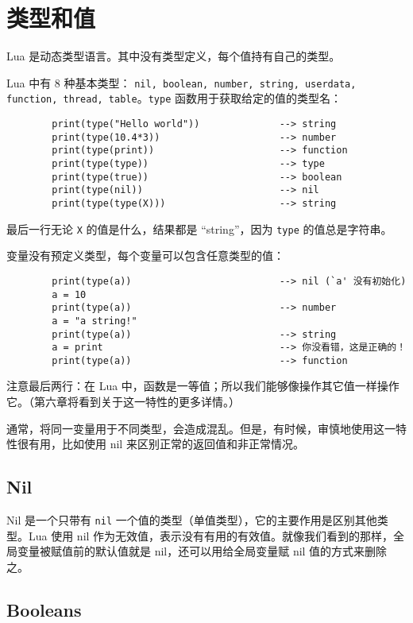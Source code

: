 \chapter{类型和值}

Lua 是动态类型语言。其中没有类型定义，每个值持有自己的类型。

Lua 中有 8 种基本类型： \verb|nil, boolean, number, string, userdata, function, thread, table|。\verb|type| 函数用于获取给定的值的类型名：
\begin{verbatim}
        print(type("Hello world"))              --> string
        print(type(10.4*3))                     --> number
        print(type(print))                      --> function
        print(type(type))                       --> type
        print(type(true))                       --> boolean
        print(type(nil))                        --> nil
        print(type(type(X)))                    --> string
\end{verbatim}
最后一行无论 \verb|X| 的值是什么，结果都是 ``string''，因为 \verb|type| 的值总是字符串。

变量没有预定义类型，每个变量可以包含任意类型的值：
\begin{verbatim}
        print(type(a))                          --> nil (`a' 没有初始化)
        a = 10
        print(type(a))                          --> number
        a = "a string!"
        print(type(a))                          --> string
        a = print                               --> 你没看错，这是正确的！
        print(type(a))                          --> function
\end{verbatim}
注意最后两行：在 Lua 中，函数是一等值；所以我们能够像操作其它值一样操作它。（第六章将看到关于这一特性的更多详情。）

通常，将同一变量用于不同类型，会造成混乱。但是，有时候，审慎地使用这一特性很有用，比如使用 nil 来区别正常的返回值和非正常情况。

\section{Nil}

Nil 是一个只带有 \verb|nil| 一个值的类型（单值类型），它的主要作用是区别其他类型。Lua 使用 nil 作为无效值，表示没有有用的有效值。就像我们看到的那样，全局变量被赋值前的默认值就是 nil，还可以用给全局变量赋 nil 值的方式来删除之。

\section{Booleans}

